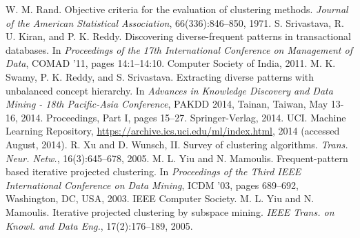 \documentclass[a4paper, 11pt, oneside]{Thesis}  %
\begin{document}
\begin{thebibliography}{99}
		W. M. Rand. Objective criteria for the evaluation of
		clustering methods. \emph{Journal of the American
		Statistical Association}, 66(336):846–850, 1971.
		S. Srivastava, R. U. Kiran, and P. K. Reddy.
		Discovering diverse-frequent patterns in transactional
		databases. In \emph{Proceedings of the 17th International
		Conference on Management of Data}, COMAD ’11,
		pages 14:1–14:10. Computer Society of India, 2011.
		M. K. Swamy, P. K. Reddy, and S. Srivastava.
		Extracting diverse patterns with unbalanced concept
		hierarchy. In \emph{Advances in Knowledge Discovery and
		Data Mining - 18th Pacific-Asia Conference}, PAKDD
		2014, Tainan, Taiwan, May 13-16, 2014. Proceedings,
		Part I, pages 15–27. Springer-Verlag, 2014.
		UCI. Machine Learning Repository,
		\url{https://archive.ics.uci.edu/ml/index.html}, 2014
		(accessed August, 2014).
		R. Xu and D. Wunsch, II. Survey of clustering
		algorithms. \emph{Trans. Neur. Netw.}, 16(3):645–678, 2005.
		M. L. Yiu and N. Mamoulis. Frequent-pattern based
		iterative projected clustering. In \emph{Proceedings of the
			Third IEEE International Conference on Data
		Mining}, ICDM ’03, pages 689–692, Washington, DC,
		USA, 2003. IEEE Computer Society.
		M. L. Yiu and N. Mamoulis. Iterative projected
		clustering by subspace mining. \emph{IEEE Trans. on
		Knowl. and Data Eng.}, 17(2):176–189, 2005.
\end{thebibliography}
\end{document}
